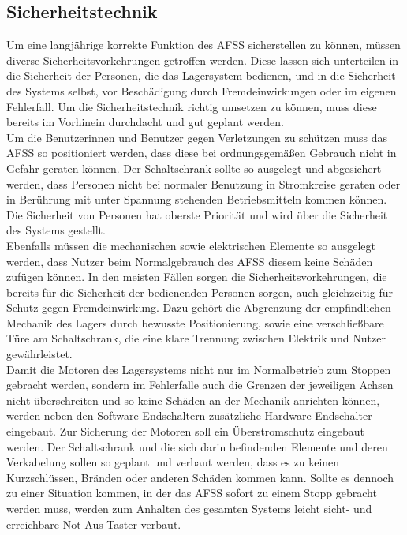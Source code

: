 \subsection{Sicherheitstechnik}
Um eine langjährige korrekte Funktion des AFSS sicherstellen zu können, müssen diverse Sicherheitsvorkehrungen getroffen werden. Diese lassen sich unterteilen in die Sicherheit der Personen, die das Lagersystem bedienen, und in die Sicherheit des Systems selbst, vor Beschädigung durch Fremdeinwirkungen oder im eigenen Fehlerfall. Um die Sicherheitstechnik richtig umsetzen zu können, muss diese bereits im Vorhinein durchdacht und gut geplant werden.\\
Um die Benutzerinnen und Benutzer gegen Verletzungen zu schützen muss das AFSS so positioniert werden, dass diese bei ordnungsgemäßen Gebrauch nicht in Gefahr geraten können. Der Schaltschrank sollte so ausgelegt und abgesichert werden, dass Personen nicht bei normaler Benutzung in Stromkreise geraten oder in Berührung mit unter Spannung stehenden Betriebsmitteln kommen können. Die Sicherheit von Personen hat oberste Priorität und wird über die Sicherheit des Systems gestellt.\\
Ebenfalls müssen die mechanischen sowie elektrischen Elemente so ausgelegt werden, dass Nutzer beim Normalgebrauch des AFSS diesem keine Schäden zufügen können. In den meisten Fällen sorgen die Sicherheitsvorkehrungen, die bereits für die Sicherheit der bedienenden Personen sorgen, auch gleichzeitig für Schutz gegen Fremdeinwirkung. Dazu gehört die Abgrenzung der empfindlichen Mechanik des Lagers durch bewusste Positionierung, sowie eine verschließbare Türe am Schaltschrank, die eine klare Trennung zwischen Elektrik und Nutzer gewährleistet.\\
Damit die Motoren des Lagersystems nicht nur im Normalbetrieb zum Stoppen gebracht werden, sondern im Fehlerfalle auch die Grenzen der jeweiligen Achsen nicht überschreiten und so keine Schäden an der Mechanik anrichten können, werden neben den Software-Endschaltern zusätzliche Hardware-Endschalter eingebaut. Zur Sicherung der Motoren soll ein Überstromschutz eingebaut werden. Der Schaltschrank und die sich darin befindenden Elemente und deren Verkabelung sollen so geplant und verbaut werden, dass es zu keinen Kurzschlüssen, Bränden oder anderen Schäden kommen kann. Sollte es dennoch zu einer Situation kommen, in der das AFSS sofort zu einem Stopp gebracht werden muss, werden zum Anhalten des gesamten Systems leicht sicht- und erreichbare Not-Aus-Taster verbaut.

